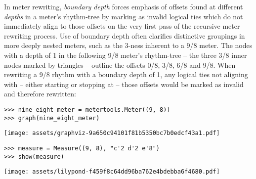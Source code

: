 In meter rewriting, \emph{boundary depth} forces emphasis of offsets found at
different \emph{depths} in a meter's rhythm-tree by marking as invalid logical
ties which do not immediately align to those offsets on the very first pass of
the recursive meter rewriting process. Use of boundary depth often clarifies
distinctive groupings in more deeply nested meters, such as the 3-ness inherent
to a 9/8 meter. The nodes with a depth of 1 in the following 9/8 meter's
rhythm-tree -- the three 3/8 inner nodes marked by triangles -- outline the
offsets 0/8, 3/8, 6/8 and 9/8. When rewriting a 9/8 rhythm with a boundary
depth of 1, any logical ties not aligning with -- either starting or
stopping at -- those offsets would be marked as invalid and therefore
rewritten:

\begin{comment}
<abjad>
nine_eight_meter = metertools.Meter((9, 8))
graph(nine_eight_meter)
</abjad>
\end{comment}

\begin{singlespacing}
\vspace{-0.5\baselineskip}
\begin{lstlisting}
>>> nine_eight_meter = metertools.Meter((9, 8))
>>> graph(nine_eight_meter)
\end{lstlisting}
\noindent\texttt{[image: assets/graphviz-9a650c94101f81b5350bc7b0edcf43a1.pdf]}
\end{singlespacing}

\begin{comment}
<abjad>
measure = Measure((9, 8), "c'2 d'2 e'8")
show(measure)
</abjad>
\end{comment}

\begin{singlespacing}
\vspace{-0.5\baselineskip}
\begin{lstlisting}
>>> measure = Measure((9, 8), "c'2 d'2 e'8")
>>> show(measure)
\end{lstlisting}
\noindent\texttt{[image: assets/lilypond-f459f8c64dd96ba762e4bdebba6f4680.pdf]}
\end{singlespacing}

\begin{comment}
<abjad>
mutate(measure).rewrite_meter(nine_eight_meter)
show(measure)
</abjad>
\end{comment}

